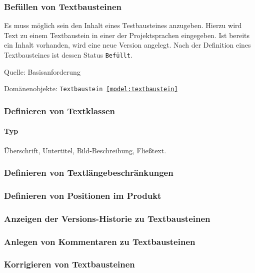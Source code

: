 \subsubsection{Befüllen von Textbausteinen}

Es muss möglich sein den Inhalt eines Testbausteines anzugeben. Hierzu wird Text zu einem Textbaustein in einer der Projektsprachen eingegeben. Ist bereits ein Inhalt vorhanden, wird eine neue Version angelegt. Nach der Definition eines Textbausteines ist dessen Status \texttt{Befüllt}.

\textsf{Quelle:} Basisanforderung

\textsf{Domänenobjekte:} \texttt{Textbaustein \ref{model:textbaustein}}

\TODO

\subsubsection{Definieren von Textklassen}

\paragraph{Typ} Überschrift, Untertitel, Bild-Beschreibung, Fließtext.

\subsubsection{Definieren von Textlängebeschränkungen}

\subsubsection{Definieren von Positionen im Produkt}

\subsubsection{Anzeigen der Versions-Historie zu Textbausteinen}

\subsubsection{Anlegen von Kommentaren zu Textbausteinen}

\subsubsection{Korrigieren von Textbausteinen}

